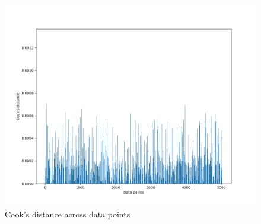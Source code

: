 \documentclass[9pt]{IEEEtran}
\begin{document}
 \newpage
\begin{figure}[H]
    \centering
    \includegraphics[width=0.9\columnwidth]{figures/cook.png}
    \caption{Cook's distance across data points}
    \label{fig:cook}
\end{figure}
\end{document}
